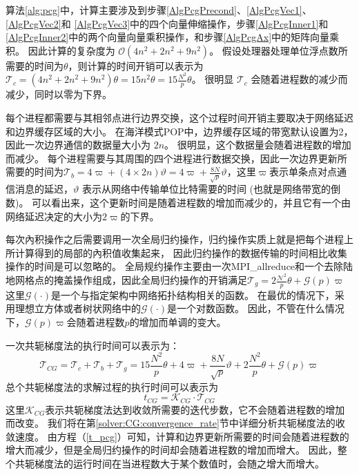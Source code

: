 算法\ref{alg:pcg}中，计算主要涉及到步骤\ref{AlgPcgPrecond}、\ref{AlgPcgVec1}、\ref{AlgPcgVec2}和 \ref{AlgPcgVec3}中的四个向量伸缩操作，步骤\ref{AlgPcgInner1}和\ref{AlgPcgInner2}中的两个向量向量乘积操作，和步骤\ref{AlgPcgAx}中的矩阵向量乘积。 
因此计算的复杂度为 $\mathcal{O} (4 n^2 +2n^2+ 9n^2)$。 
假设处理器处理单位浮点数所需要的时间为$\theta$，则计算的时间开销可以表示为
$\mathcal{T}_c=  (4 n^2 +2n^2+ 9n^2)\theta = 15n^2\theta  = 15\frac{N^2}{p}\theta $。 
很明显 $\mathcal{T}_c$ 会随着进程数的减少而减少，同时以零为下界。 


每个进程都需要与其相邻点进行边界交换，这个过程时间开销主要取决于网络延迟和边界缓存区域的大小。 
在海洋模式POP中，边界缓存区域的带宽默认设置为2，因此一次边界通信的数据量大小为 $2n$。 
很明显，这个数据量会随着进程数的增加而减少。 
每个进程需要与其周围的四个进程进行数据交换，因此一次边界更新所需要的时间为$\mathcal{T}_b =4\varpi + (4\times 2n)\vartheta=4\varpi + \frac{8N}{\sqrt{p}}\vartheta$，这里$\varpi$表示单条点对点通信消息的延迟，$\vartheta$ 表示从网络中传输单位比特需要的时间 (也就是网络带宽的倒数)。 
可以看出来，这个更新时间是随着进程数的增加而减少的，并且它有一个由网络延迟决定的大小为$2\varpi$的下界。



每次內积操作之后需要调用一次全局归约操作，归约操作实质上就是把每个进程上所计算得到的局部的內积值收集起来，
因此归约操作的数据传输的时间相比收集操作的时间是可以忽略的。 
全局规约操作主要由一次MPI\_allreduce和一个去除陆地网格点的掩盖操作组成，因此全局归约操作的开销满足$\mathcal{T}_g= 2\frac{\mathcal{N}^2}{p}\theta + \mathcal{G}(p)\varpi$  
这里$\mathcal{G}(\cdot)$是一个与指定架构中网络拓扑结构相关的函数。 
在最优的情况下，采用理想立方体或者树状网络中的$\mathcal{G}(\cdot)$是一个对数函数。 
因此，不管在什么情况下，$\mathcal{G}(p)\varpi$会随着进程数$p$的增加而单调的变大。 
 
一次共轭梯度法的执行时间可以表示为：
\begin{equation}
\label{t_pcg}
\mathcal{T}_{CG} = \mathcal{T}_c + \mathcal{T}_b + \mathcal{T}_g
= 15\frac{N^2}{p}\theta + 4\varpi + \frac{8N}{\sqrt{p}}\vartheta+2\frac{N^2}{p}\theta + \mathcal{G}(p)\varpi
\end{equation}
总个共轭梯度法的求解过程的执行时间可以表示为
\begin{equation}
\label{t_pcg_all}
t_{CG} = \mathcal{K}_{CG}\cdot \mathcal{T}_{CG}
\end{equation}
这里$\mathcal{K}_{CG}$表示共轭梯度法达到收敛所需要的迭代步数，它不会随着进程数的增加而改变。
我们将在第\ref{solver:CG:convergence_rate}节中详细分析共轭梯度法的收敛速度。
由方程（\ref{t_pcg}）可知，计算和边界更新所需要的时间会随着进程数的增大而减少，但是全局归约操作的时间却会随着进程数的增加而增大。
因此，整个共轭梯度法的运行时间在当进程数大于某个数值时，会随之增大而增大。



